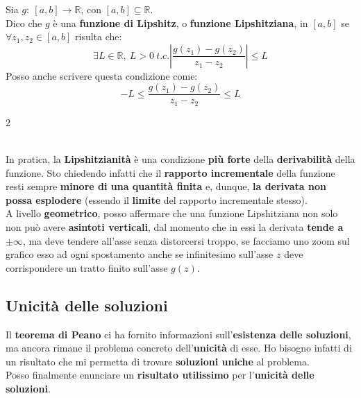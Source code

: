 \documentclass[a4paper, oneside]{article}
\newcommand\R{\mathbb{R}}
\begin{document}
    \begin{aside}
    Sia $g:\ [a,b]\to\R$, con $[a,b]\subseteq\R$. \\
    Dico che $g$ è una \textbf{funzione di Lipshitz}, o \textbf{funzione Lipshitziana}, in $[a,b]$ se
    $\forall z_1,z_2\in [a,b]$ risulta che:
    \[\exists L\in\R, \ L>0 \ t.c. \left|\frac{g(z_1)-g(z_2)}{z_1-z_2}\right| \leq L\]
    Posso anche scrivere questa condizione come:
    \[-L\leq \frac{g(z_1)-g(z_2)}{z_1-z_2} \leq L\]

    \begin{multicols}{2}
    \columnbreak
    \hfill\\
    \noindent
    In pratica, la \textbf{Lipshitzianità} è una condizione \textbf{più forte} della \textbf{derivabilità} della funzione. 
    Sto chiedendo infatti che il \textbf{rapporto incrementale} della funzione resti sempre \textbf{minore di una quantità finita}
    e, dunque, \textbf{la derivata non possa esplodere} (essendo il \textbf{limite} del rapporto incrementale stesso).\\
    A livello \textbf{geometrico}, posso affermare che una funzione Lipshitziana non solo non può avere \textbf{asintoti verticali}, dal
    momento che in essi la derivata \textbf{tende a $\pm\infty$}, ma deve tendere all'asse senza distorcersi troppo, se facciamo uno zoom sul grafico esso ad ogni spostamento anche se infinitesimo sull'asse $z$ deve corrispondere un tratto finito sull'asse $g(z)$.
    \end{multicols}
    \end{aside}

    \subsection{Unicità delle soluzioni}
    Il \textbf{teorema di Peano} ci ha fornito informazioni sull'\textbf{esistenza delle soluzioni}, ma ancora 
    rimane il problema concreto dell'\textbf{unicità} di esse. Ho bisogno infatti di un risultato che mi permetta
    di trovare \textbf{soluzioni uniche} al problema. \\
    Posso finalmente enunciare un \textbf{risultato utilissimo} per l'\textbf{unicità delle soluzioni}. 
\end{document}
